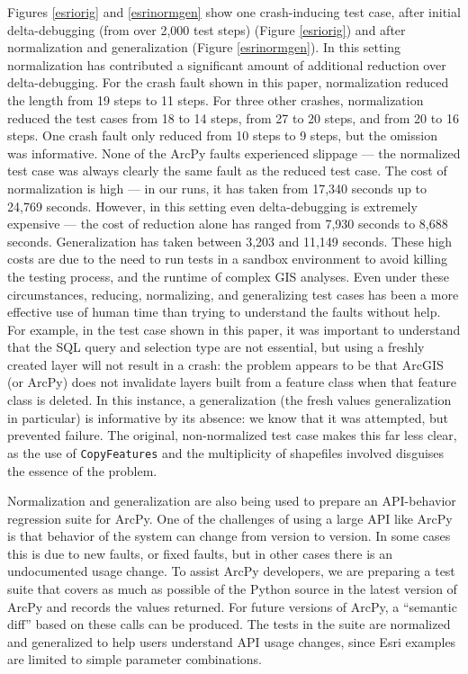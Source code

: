 
Figures \ref{esriorig} and
\ref{esrinormgen} show one crash-inducing test case, after initial
delta-debugging (from over 2,000 test steps) (Figure \ref{esriorig})
and after normalization and generalization (Figure \ref{esrinormgen}).
In this setting normalization has contributed a significant amount of
additional reduction over delta-debugging.  For the crash fault shown
in this paper, normalization reduced the length from 19 steps to 11
steps.  For three other crashes, normalization reduced the test cases
from 18 to 14 steps, from 27 to 20 steps, and from 20 to 16 steps. One crash fault only reduced from 10 steps to 9 steps, but the
omission was informative.  None of the ArcPy faults experienced slippage --- the normalized
test case was always clearly the same fault as the reduced test case.
 The cost of normalization is high --- in
our runs, it has taken from 17,340 seconds up to 24,769 seconds.
However, in this setting even delta-debugging is extremely expensive
--- the cost of reduction alone has ranged from 7,930 seconds to 8,688
seconds.  Generalization has taken between 3,203 and
 11,149 seconds.  These high costs are due to the need to run
tests in a sandbox environment to avoid killing the testing
process, and the runtime of complex GIS analyses.
Even under these circumstances, reducing, normalizing, and
generalizing test cases has been a more effective use of human time than
trying to understand the faults without help.  For example, in
the test case shown in this paper, it was important to understand that
the SQL query and selection type are not essential, but using a
freshly created layer will not result in a crash: the problem appears
to be that ArcGIS (or ArcPy) does not invalidate layers built from a
feature class when that feature class is deleted.  In this
  instance, a generalization (the fresh values generalization in
  particular) is informative by its absence: we know that it was attempted, but prevented
  failure.  The original, non-normalized test case
makes this far less clear, as the use of {\tt CopyFeatures} and the
multiplicity of shapefiles involved disguises the essence of the
problem.  

Normalization and generalization are also being used to prepare an
API-behavior regression suite for ArcPy.  One of the challenges of
using a large API like ArcPy is that behavior of the system can change
from version to version.  In some cases this is due to new faults, or
fixed faults, but in other cases there is an undocumented usage change.  To assist ArcPy
developers, we are preparing a test suite that covers as much as
possible of the Python source in the latest version of ArcPy
and records the values returned.  For future versions of ArcPy, a ``semantic diff'' based on these calls
can be produced.  The tests in the suite are
normalized and generalized to help users understand API usage changes, since Esri examples are limited to simple parameter combinations.

